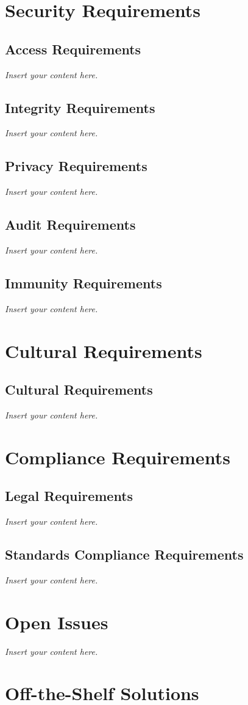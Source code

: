 \documentclass[12pt]{article}
\newcommand{\lips}{\textit{Insert your content here.}}
\begin{document}
\section{Security Requirements}
\subsection{Access Requirements}
\lips
\subsection{Integrity Requirements}
\lips
\subsection{Privacy Requirements}
\lips
\subsection{Audit Requirements}
\lips
\subsection{Immunity Requirements}
\lips

\section{Cultural Requirements}
\subsection{Cultural Requirements}
\lips

\section{Compliance Requirements}
\subsection{Legal Requirements}
\lips
\subsection{Standards Compliance Requirements}
\lips

\section{Open Issues}
\lips
\section{Off-the-Shelf Solutions}
\end{document}
